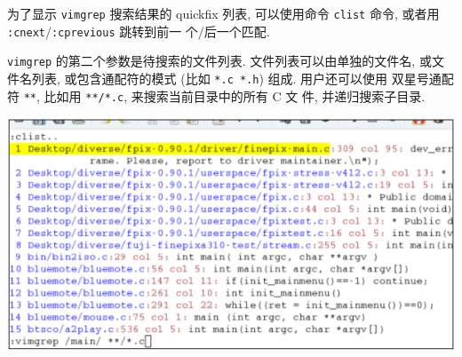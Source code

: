 \begin{warning}
    为了显示 \texttt{vimgrep} 搜索结果的 quickfix 列表, 可以使用命令
    \texttt{clist} 命令, 或者用 \texttt{:cnext}/\texttt{:cprevious} 跳转到前一
    个/后一个匹配.
\end{warning}

\texttt{vimgrep} 的第二个参数是待搜索的文件列表. 文件列表可以由单独的文件名,
或文件名列表, 或包含通配符的模式 (比如 \texttt{*.c *.h}) 组成. 用户还可以使用
双星号通配符 \texttt{**}, 比如用 \texttt{**/*.c}, 来搜索当前目录中的所有 C 文
件, 并递归搜索子目录.
\begin{center}
    \includegraphics[scale=0.7]{./images/page66.png}
\end{center}
